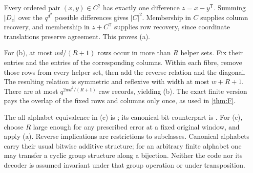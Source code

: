 \begin{outline}
Every ordered pair $(x,y)\in C^2$ has exactly one difference $z=x-y^{\mathsf T}$. Summing $|D_z|$ over the $q^{d^2}$
possible differences gives $|C|^2$. Membership in $C$ supplies column recovery, and membership in $z+C^{\mathsf T}$
supplies row recovery, since coordinate translations preserve agreement. This proves (a).

For (b), at most $wd/(R+1)$ rows occur in more than $R$ helper sets. Fix their entries and the entries of the
corresponding columns. Within each fibre, remove those rows from every helper set, then add the reverse relation
and the diagonal. The resulting relation is symmetric and reflexive with width at most $w+R+1$. There are at most
$q^{2wd^2/(R+1)}$ raw records, yielding (b). The exact finite version pays the overlap of the fixed rows and columns
only once, as used in \cref{thm:F}.

The all-alphabet equivalence in (c) is
; its canonical-bit counterpart is
.
For (c), choose $R$ large enough for any prescribed error at a fixed original window, and apply (a). Reverse
implications are restrictions to subclasses. Canonical alphabets carry their usual bitwise additive structure;
for an arbitrary finite alphabet one may transfer a cyclic group structure along a bijection. Neither the code nor
its decoder is assumed invariant under that group operation or under transposition.
\end{outline}
